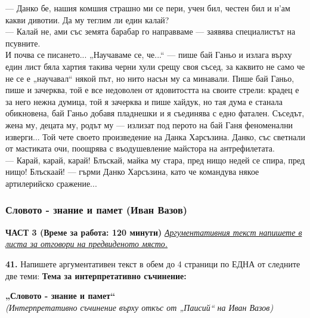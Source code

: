 \documentclass[12pt,a4paper]{article}
\begin{document}
    — Данко бе, нашия комшия страшно ми се пери, учен бил, честен бил и н’ам какви дивотии. Да му теглим ли един калай?\\
    — Калай не, ами със земята барабар го направваме — заявява специалистът на псувните.\\
И почва се писането... „Научаваме се, че...“ — пише бай Ганьо и излага върху един лист бяла хартия такива черни хули срещу своя съсед, за каквито не само че не се е „научавал“ някой път, но нито насън му са минавали. Пише бай Ганьо, пише и зачерква, той е все недоволен от ядовитостта на своите стрели: крадец е за него нежна думица, той я зачерква и пише хайдук,   но тая дума е станала обикновена, бай Ганьо добавя пладнешки и я съединява с едно фатален. Съседът, жена му, децата му, родът му — излизат под перото на бай Ганя феноменални изверги... Той чете своето произведение на Данка Харсъзина. Данко, със светнали от мастиката очи, поощрява с въодушевление майстора на антрефилетата.\\
    — Карай, карай, карай! Блъскай, майка му стара, пред нищо недей се спира, пред нищо! Блъскаай! — гърми Данко Харсъзина, като че командува някое артилерийско сражение...\\

\subsubsection{Словото - знание и памет (Иван Вазов)}
\vspace{0.5cm}
\begin{center}
\textbf{ЧАСТ 3 (Време за работа: 120 минути)}
\vspace{0.2cm}
{\textit{\underline{Аргументативния текст напишете в листа за отговори на предвиденото място.}}}
\vspace{0.1cm}
\end{center}
\textbf{41.} Напишете аргументативен текст в обем до 4 страници по ЕДНА от следните две теми:
\vspace{0.2cm}
\textbf{Тема за интерпретативно съчинение:}
\vspace{0.1cm}
\begin{center}
\textbf{„Словото - знание и памет“}
\\
\textit{(Интерпретативно съчинение върху откъс от  „Паисий“ на Иван Вазов)}
\end{center}
\end{document}
